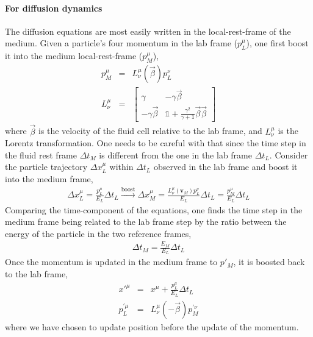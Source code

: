 \paragraph{For diffusion dynamics} The diffusion equations are most easily  written in the local-rest-frame of the medium.
Given a particle's four momentum in the lab frame ($p_{L}^\mu$), one first boost it into the medium local-rest-frame ($p_{M}^\mu$),
\begin{eqnarray}
p_{M}^\mu &=& L^\mu_\nu(\vec{\beta}) p_{L}^\nu\\
L^\mu_\nu &=& 
\begin{bmatrix}
\gamma & -\gamma\vec{\beta}\\
-\gamma\vec{\beta} & \mathbb{1} + \frac{\gamma^2}{\gamma+1}\vec{\beta}\vec{\beta}
\end{bmatrix}
\end{eqnarray}
where $\vec{\beta}$ is the velocity of the fluid cell relative to the lab frame, and $L^\mu_\nu$ is the Lorentz transformation.
One needs to be careful with that since the time step in the fluid rest frame $\Delta t_{M}$ is different from the one in the lab frame $\Delta t_{L}$.
Consider the particle trajectory $\Delta x_{L}^\mu$ within $\Delta t_{L}$ observed in the lab frame and boost it into the medium frame,
\begin{eqnarray}
\Delta x_{L}^\mu = \frac{p_{L}^\mu}{E_L} \Delta t_{L} \xrightarrow{\textrm{boost}} \Delta x_{M}^\mu = \frac{L^\mu_\nu(\mathbf{v}_{M}) p_{L}^\nu}{E_L} \Delta t_L = \frac{p_{M}^\mu}{E_L} \Delta t_L
\end{eqnarray}
Comparing the time-component of the equations, one finds the time step in the medium frame being related to the lab frame step by the ratio between the energy of the particle in the two reference frames,
\begin{eqnarray}
\Delta t_M = \frac{E_M}{E_L} \Delta t_L
\end{eqnarray}
Once the momentum is updated in the medium frame to $p'_M$, it is boosted back to the lab frame,
\begin{eqnarray}
x'^{\mu} &=& x^{\mu} + \frac{p_{L}^\mu}{E_L} \Delta t_{L} \\
p_{L}^{'\mu} &=& L^\mu_\nu(-\vec{\beta}) p_{M}^{'\nu}
\end{eqnarray}
where we have chosen to update position before the update of the momentum.

